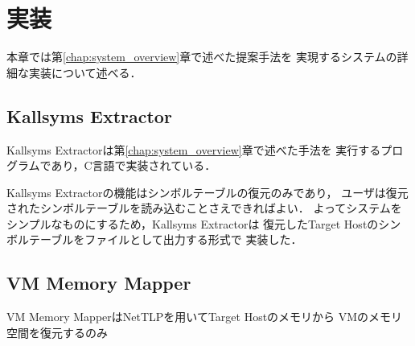 \chapter{実装}
\label{chap:implementation}

本章では第\ref{chap:system_overview}章で述べた提案手法を
実現するシステムの詳細な実装について述べる．

\section{Kallsyms Extractor}

Kallsyms Extractorは第\ref{chap:system_overview}章で述べた手法を
実行するプログラムであり，C言語で実装されている．

Kallsyms Extractorの機能はシンボルテーブルの復元のみであり，
ユーザは復元されたシンボルテーブルを読み込むことさえできればよい．
よってシステムをシンプルなものにするため，Kallsyms Extractorは
復元したTarget Hostのシンボルテーブルをファイルとして出力する形式で
実装した．

\section{VM Memory Mapper}

VM Memory MapperはNetTLPを用いてTarget Hostのメモリから
VMのメモリ空間を復元するのみ
